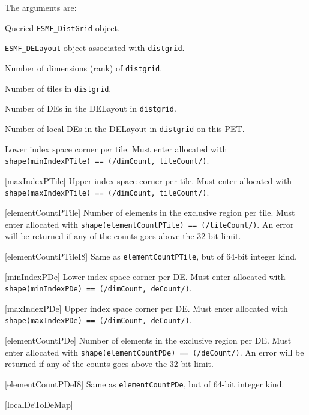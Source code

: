      The arguments are:
     \begin{description}
     \item[distgrid] 
       Queried {\tt ESMF\_DistGrid} object.
     \item[{[delayout]}]
       {\tt ESMF\_DELayout} object associated with {\tt distgrid}.
     \item[{[dimCount]}]
       Number of dimensions (rank) of {\tt distgrid}.
     \item[{[tileCount]}]
       Number of tiles in {\tt distgrid}.
     \item[{[deCount]}]
       Number of DEs in the DELayout in {\tt distgrid}.
     \item[{[localDeCount]}]
       Number of local DEs in the DELayout in {\tt distgrid} on this PET.
     \item[{[minIndexPTile]}]
       \begin{sloppypar}
       Lower index space corner per tile. Must enter
       allocated with {\tt shape(minIndexPTile) == (/dimCount, tileCount/)}.
     \item[{[maxIndexPTile]}]
       Upper index space corner per tile. Must enter
       allocated with {\tt shape(maxIndexPTile) == (/dimCount, tileCount/)}.
     \item[{[elementCountPTile]}]
       Number of elements in the exclusive region per tile. Must enter
       allocated with {\tt shape(elementCountPTile) == (/tileCount/)}.
       An error will be returned if any of the counts goes above the 32-bit
       limit.
     \item[{[elementCountPTileI8]}]
       Same as {\tt elementCountPTile}, but of 64-bit integer kind.
     \item[{[minIndexPDe]}]
       Lower index space corner per DE. Must enter
       allocated with {\tt shape(minIndexPDe) == (/dimCount, deCount/)}.
     \item[{[maxIndexPDe]}]
       Upper index space corner per DE. Must enter
       allocated with {\tt shape(maxIndexPDe) == (/dimCount, deCount/)}.
     \item[{[elementCountPDe]}]
       Number of elements in the exclusive region per DE. Must enter
       allocated with {\tt shape(elementCountPDe) == (/deCount/)}.
       An error will be returned if any of the counts goes above the 32-bit
       limit.
     \item[{[elementCountPDeI8]}]
       Same as {\tt elementCountPDe}, but of 64-bit integer kind.
     \item[{[localDeToDeMap]}]

\end{sloppypar}
\end{description}
